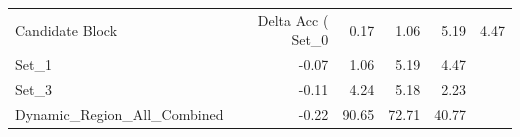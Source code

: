 \begin{tabular}{lrrrr}
\toprule
Candidate Block & Delta Acc (%
\midrule
Set_0 & 0.17 & 1.06 & 5.19 & 4.47 \\
Set_1 & -0.07 & 1.06 & 5.19 & 4.47 \\
Set_3 & -0.11 & 4.24 & 5.18 & 2.23 \\
Dynamic_Region_All_Combined & -0.22 & 90.65 & 72.71 & 40.77 \\
\bottomrule
\end{tabular}
